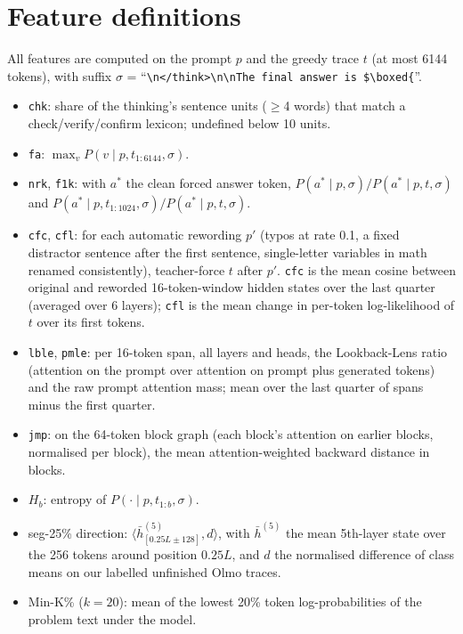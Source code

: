 \documentclass{article}
\begin{document}



\appendix
\section{Feature definitions}
\label{app:features}
All features are computed on the prompt $p$ and the greedy trace $t$ (at most 6144 tokens), with suffix $\sigma$ = ``\texttt{\textbackslash n</think>\textbackslash n\textbackslash nThe final answer is \$\textbackslash boxed\{}''.
\begin{itemize}
\item \texttt{chk}: share of the thinking's sentence units ($\ge$4 words) that match a check/verify/confirm lexicon; undefined below 10 units.
\item \texttt{fa}: $\max_v P(v \mid p, t_{1:6144}, \sigma)$.
\item \texttt{nrk}, \texttt{f1k}: with $a^*$ the clean forced answer token, $P(a^*\mid p,\sigma)/P(a^*\mid p,t,\sigma)$ and $P(a^*\mid p,t_{1:1024},\sigma)/P(a^*\mid p,t,\sigma)$.
\item \texttt{cfc}, \texttt{cfl}: for each automatic rewording $p'$ (typos at rate 0.1, a fixed distractor sentence after the first sentence, single-letter variables in math renamed consistently), teacher-force $t$ after $p'$. \texttt{cfc} is the mean cosine between original and reworded 16-token-window hidden states over the last quarter (averaged over 6 layers); \texttt{cfl} is the mean change in per-token log-likelihood of $t$ over its first tokens.
\item \texttt{lble}, \texttt{pmle}: per 16-token span, all layers and heads, the Lookback-Lens ratio (attention on the prompt over attention on prompt plus generated tokens) and the raw prompt attention mass; mean over the last quarter of spans minus the first quarter.
\item \texttt{jmp}: on the 64-token block graph (each block's attention on earlier blocks, normalised per block), the mean attention-weighted backward distance in blocks.
\item $H_b$: entropy of $P(\cdot\mid p,t_{1:b},\sigma)$.
\item seg-25\% direction: $\langle \bar h^{(5)}_{[0.25L\pm128]}, d\rangle$, with $\bar h^{(5)}$ the mean 5th-layer state over the 256 tokens around position $0.25L$, and $d$ the normalised difference of class means on our labelled unfinished Olmo traces.
\item Min-K\% ($k=20$): mean of the lowest 20\% token log-probabilities of the problem text under the model.
\end{itemize}
\end{document}
